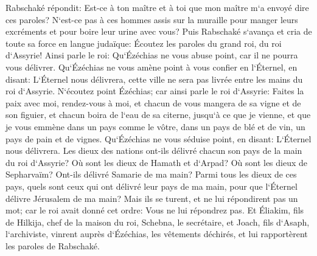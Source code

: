 \verse Rabschaké répondit: Est-ce à ton maître et à toi que mon maître m`a envoyé dire ces paroles? N`est-ce pas à ces hommes assis sur la muraille pour manger leurs excréments et pour boire leur urine avec vous? 
\verse Puis Rabschaké s`avança et cria de toute sa force en langue judaïque: Écoutez les paroles du grand roi, du roi d`Assyrie! 
\verse Ainsi parle le roi: Qu`Ézéchias ne vous abuse point, car il ne pourra vous délivrer. 
\verse Qu`Ézéchias ne vous amène point à vous confier en l`Éternel, en disant: L`Éternel nous délivrera, cette ville ne sera pas livrée entre les mains du roi d`Assyrie. 
\verse N`écoutez point Ézéchias; car ainsi parle le roi d`Assyrie: Faites la paix avec moi, rendez-vous à moi, et chacun de vous mangera de sa vigne et de son figuier, et chacun boira de l`eau de sa citerne, 
\verse jusqu`à ce que je vienne, et que je vous emmène dans un pays comme le vôtre, dans un pays de blé et de vin, un pays de pain et de vignes. 
\verse Qu`Ézéchias ne vous séduise point, en disant: L`Éternel nous délivrera. Les dieux des nations ont-ils délivré chacun son pays de la main du roi d`Assyrie? 
\verse Où sont les dieux de Hamath et d`Arpad? Où sont les dieux de Sepharvaïm? Ont-ils délivré Samarie de ma main? 
\verse Parmi tous les dieux de ces pays, quels sont ceux qui ont délivré leur pays de ma main, pour que l`Éternel délivre Jérusalem de ma main? 
\verse Mais ils se turent, et ne lui répondirent pas un mot; car le roi avait donné cet ordre: Vous ne lui répondrez pas. 
\verse Et Éliakim, fils de Hilkija, chef de la maison du roi, Schebna, le secrétaire, et Joach, fils d`Asaph, l`archiviste, vinrent auprès d`Ézéchias, les vêtements déchirés, et lui rapportèrent les paroles de Rabschaké. 

